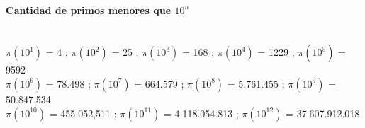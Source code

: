  
\paragraph{Cantidad de primos menores que $10^n$}\ \\
$\pi(10^1)$ = 4 ;
$\pi(10^2)$ = 25 ;
$\pi(10^3)$ = 168 ;
$\pi(10^4)$ = 1229 ;
$\pi(10^5)$ = 9592 \\
$\pi(10^6)$ = 78.498 ;
$\pi(10^7)$ = 664.579 ;
$\pi(10^8)$ = 5.761.455 ;
$\pi(10^9)$ = 50.847.534 \\
$\pi(10^{10})$ = 455.052,511 ;
$\pi(10^{11})$ = 4.118.054.813 ;
$\pi(10^{12})$ = 37.607.912.018%
%
%
%

